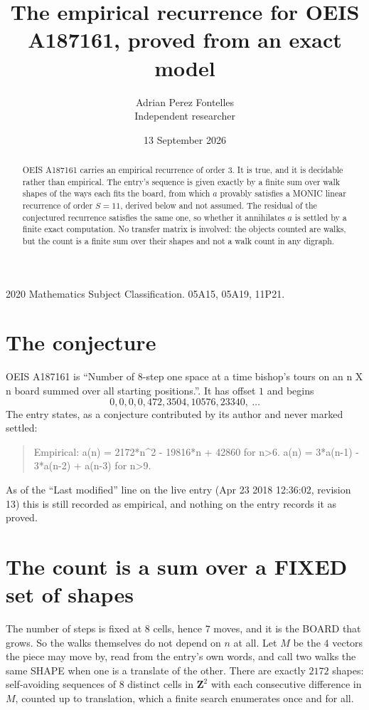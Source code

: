 \documentclass[11pt,a4paper]{article}
\title{The empirical recurrence for OEIS A187161, proved from an exact model}
\author{Adrian Perez Fontelles\\ \small Independent researcher}
\date{13 September 2026}
\theoremstyle{plain}
\theoremstyle{definition}
\begin{document}
\maketitle

\begin{abstract}
OEIS A187161 carries an empirical recurrence of order $3$. It is true, and it is
decidable rather than empirical. The entry's sequence is given exactly by a finite sum over walk shapes of the ways each fits the board, from
which $a$ provably satisfies a MONIC linear recurrence of order $S=11$, derived below and not
assumed. The residual of the conjectured recurrence satisfies the same one, so whether it
annihilates $a$ is settled by a finite exact computation. No transfer matrix is involved: the objects counted are walks, but the count is a finite sum over their shapes and not a walk count in any digraph.
\end{abstract}

\noindent\small 2020 Mathematics Subject Classification. 05A15, 05A19, 11P21.\normalsize

\section{The conjecture}

OEIS A187161 is ``Number of 8-step one space at a time bishop's tours on an n X n board summed over all starting positions.''. It has offset $1$ and begins
\[
0, 0, 0, 0, 472, 3504, 10576, 23340,\ \dots
\]
The entry states, as a conjecture contributed by its author and never marked settled:
\begin{quote}
Empirical: a(n) = 2172*n\^{}2 - 19816*n + 42860 for n>6. a(n) = 3*a(n-1) - 3*a(n-2) + a(n-3) for n>9.
\end{quote}
As of the ``Last modified'' line on the live entry (Apr 23 2018 12:36:02, revision 13)
this is still recorded as empirical, and nothing on the entry records it as proved.

\section{The count is a sum over a FIXED set of shapes}

The number of steps is fixed at $8$ cells, hence $7$ moves, and it is the BOARD
that grows. So the walks themselves do not depend on $n$ at all. Let $M$ be the $4$
vectors the piece may move by, read from the entry's own words, and call two walks the same
SHAPE when one is a translate of the other. There are exactly $2172$ shapes: self-avoiding
sequences of $8$ distinct cells in $\mathbf{Z}^{2}$ with each consecutive difference in
$M$, counted up to translation, which a finite search enumerates once and for all.
\end{document}
